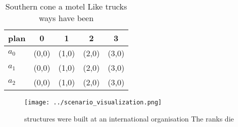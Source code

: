 \documentclass[a4paper]{article}
\begin{document}
\begin{table}
\begin{adjustbox}{width=0.6\columnwidth}
\begin{tabular}{|l|l|l|l|l|}
\hline
\textbf{plan} & \multicolumn{1}{c|}{\textbf{0}} & \multicolumn{1}{c|}{\textbf{1}} & \multicolumn{1}{c|}{\textbf{2}} & \multicolumn{1}{c|}{\textbf{3}} \\ \hline
\textbf{$a_0$}  & (0,0) & (1,0) & (2,0) & (3,0) \\ \hline
\textbf{$a_1$}  & (0,0) & (1,0) & (2,0) & (3,0) \\ \hline
\textbf{$a_2$}  & (0,0) & (1,0) & (2,0) & (3,0) \\ \hline
\end{tabular}
\end{adjustbox}
\caption{Southern cone a motel Like trucks ways have been 
}
\end{table}

\begin{figure}
\centering
\texttt{[image: ../scenario\_visualization.png]}
\caption{ structures were built at an international organisation The ranks die
}
\end{figure}
 
\end{document}
